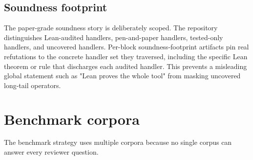 \documentclass[11pt]{article}
\begin{document}
\subsection{Soundness footprint}

The paper-grade soundness story is deliberately scoped.  The repository
distinguishes Lean-audited handlers, pen-and-paper handlers, tested-only
handlers, and uncovered handlers.  Per-block soundness-footprint artifacts pin
real refutations to the concrete handler set they traversed, including the
specific Lean theorem or rule that discharges each audited handler.  This
prevents a misleading global statement such as "Lean proves the whole tool" from
masking uncovered long-tail operators.

\section{Benchmark corpora}

The benchmark strategy uses multiple corpora because no single corpus can answer
every reviewer question.
\end{document}
